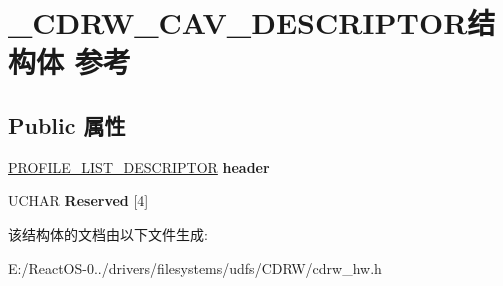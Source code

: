 \hypertarget{struct___c_d_r_w___c_a_v___d_e_s_c_r_i_p_t_o_r}{}\section{\+\_\+\+C\+D\+R\+W\+\_\+\+C\+A\+V\+\_\+\+D\+E\+S\+C\+R\+I\+P\+T\+O\+R结构体 参考}
\label{struct___c_d_r_w___c_a_v___d_e_s_c_r_i_p_t_o_r}
\subsection*{Public 属性}
\begin{DoxyCompactItemize}
\item 
\mbox{\label{struct___c_d_r_w___c_a_v___d_e_s_c_r_i_p_t_o_r_a0844458088ee551a03534e318c389e10}} 
\hyperlink{struct___p_r_o_f_i_l_e___l_i_s_t___d_e_s_c_r_i_p_t_o_r}{P\+R\+O\+F\+I\+L\+E\+\_\+\+L\+I\+S\+T\+\_\+\+D\+E\+S\+C\+R\+I\+P\+T\+OR} {\bfseries header}
\item 
\mbox{\label{struct___c_d_r_w___c_a_v___d_e_s_c_r_i_p_t_o_r_a11d737a985895873e22deef35e7e7c85}} 
U\+C\+H\+AR {\bfseries Reserved} \mbox{[}4\mbox{]}
\end{DoxyCompactItemize}


该结构体的文档由以下文件生成\+:\begin{DoxyCompactItemize}
\item 
E\+:/\+React\+O\+S-\/0../drivers/filesystems/udfs/\+C\+D\+R\+W/cdrw\+\_\+hw.\+h\end{DoxyCompactItemize}
